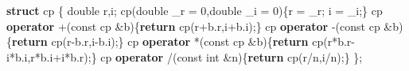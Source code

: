 \documentclass[
]{article}
\newenvironment{Shaded}{}{}
\newcommand{\AttributeTok}[1]{\textcolor[rgb]{0.49,0.56,0.16}{#1}}
\newcommand{\ControlFlowTok}[1]{\textcolor[rgb]{0.00,0.44,0.13}{\textbf{#1}}}
\newcommand{\DataTypeTok}[1]{\textcolor[rgb]{0.56,0.13,0.00}{#1}}
\newcommand{\DecValTok}[1]{\textcolor[rgb]{0.25,0.63,0.44}{#1}}
\newcommand{\KeywordTok}[1]{\textcolor[rgb]{0.00,0.44,0.13}{\textbf{#1}}}
\newcommand{\NormalTok}[1]{#1}
\begin{document}
\begin{Shaded}
\begin{Highlighting}[]
\KeywordTok{struct}\NormalTok{ cp}
\NormalTok{\{}
    \DataTypeTok{double}\NormalTok{ r,i;}
\NormalTok{    cp(}\DataTypeTok{double}\NormalTok{ \_r = }\DecValTok{0}\NormalTok{,}\DataTypeTok{double}\NormalTok{ \_i = }\DecValTok{0}\NormalTok{)\{r = \_r; i = \_i;\}}
\NormalTok{    cp }\KeywordTok{operator}\NormalTok{ +(}\AttributeTok{const}\NormalTok{ cp  \&b)\{}\ControlFlowTok{return}\NormalTok{ cp(r+b.r,i+b.i);\}}
\NormalTok{    cp }\KeywordTok{operator}\NormalTok{ {-}(}\AttributeTok{const}\NormalTok{ cp  \&b)\{}\ControlFlowTok{return}\NormalTok{ cp(r{-}b.r,i{-}b.i);\}}
\NormalTok{    cp }\KeywordTok{operator}\NormalTok{ *(}\AttributeTok{const}\NormalTok{ cp  \&b)\{}\ControlFlowTok{return}\NormalTok{ cp(r*b.r{-}i*b.i,r*b.i+i*b.r);\}}
\NormalTok{    cp }\KeywordTok{operator}\NormalTok{ /(}\AttributeTok{const} \DataTypeTok{int}\NormalTok{ \&n)\{}\ControlFlowTok{return}\NormalTok{ cp(r/n,i/n);\}}
\NormalTok{\};}


\end{Highlighting}
\end{Shaded}
\end{document}
